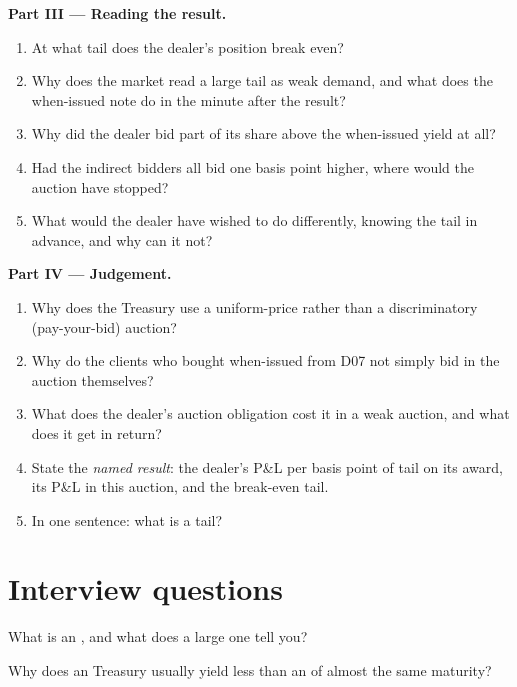 \begin{problem}
\medskip\noindent\textbf{Part III --- Reading the result.}
\begin{enumerate}[resume]
\item At what tail does the dealer's position break even?
\item Why does the market read a large tail as weak demand, and what does the
when-issued note do in the minute after the result?
\item Why did the dealer bid part of its share above the when-issued yield
at all?
\item Had the indirect bidders all bid one basis point higher, where would
the auction have stopped?
\item What would the dealer have wished to do differently, knowing the tail
in advance, and why can it not?
\end{enumerate}

\medskip\noindent\textbf{Part IV --- Judgement.}
\begin{enumerate}[resume]
\item Why does the Treasury use a uniform-price rather than a
discriminatory (pay-your-bid) auction?
\item Why do the clients who bought when-issued from D07 not simply bid in
the auction themselves?
\item What does the dealer's auction obligation cost it in a weak auction,
and what does it get in return?
\item State the \emph{named result}: the dealer's P\&L per basis point of tail
on its award, its P\&L in this auction, and the break-even tail.
\item In one sentence: what is a tail?
\end{enumerate}
\end{problem}

\section{Interview questions}

\begin{interviewq}\label{iq:m2:the-treasury-market:1}
What is an , and what does a large one tell you?
\end{interviewq}

\begin{interviewq}\label{iq:m2:the-treasury-market:2}
Why does an  Treasury usually yield less than an  of
almost the same maturity?
\end{interviewq}

